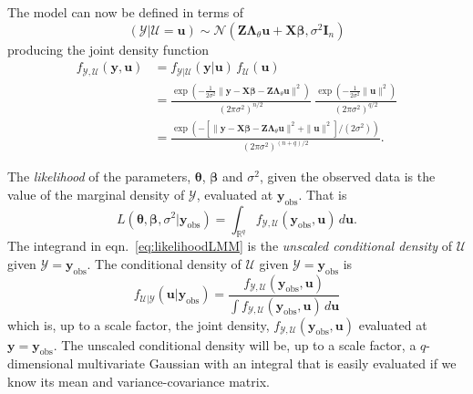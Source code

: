 \documentclass{jss}
\newcommand{\bLt}{\ensuremath{\bm\Lambda_\theta}}
\newcommand{\mc}[1]{\ensuremath{\mathcal{#1}}}
\newcommand{\yobs}{\ensuremath{\bm y_{\mathrm{obs}}}}
\newcommand*{\eq}[1]{eqn.~\ref{#1}}%
\begin{document}
The model can now be defined in terms of%
\begin{equation}
  \label{eq:LMMcondYU}
  (\mc Y|\mc U=\bm u)\sim\mc{N}(\bm Z\bm\Lambda_\theta\bm u+\bm X\bm\beta,\sigma^2\bm I_n)
\end{equation}%
producing the joint density function%
\begin{equation}
  \label{eq:jointDens}
  \begin{aligned}
    f_{\mc Y,\mc U}(\bm y,\bm u)&
    =f_{\mc Y|\mc U}(\bm y|\bm u)\,f_{\mc U}(\bm u)\\
    &=\frac{\exp(-\frac{1}{2\sigma^2}\|\bm y-\bm X\bm\beta-\bm Z\bLt\bm u\|^2)}
    {(2\pi\sigma^2)^{n/2}}\;
    \frac{\exp(-\frac{1}{2\sigma^2}\|\bm u\|^2)}{(2\pi\sigma^2)^{q/2}}\\
    &=\frac{\exp(-
      \left[\|\bm y-\bm X\bm\beta-\bm Z\bLt\bm u\|^2+\|\bm u\|^2\right]/(2\sigma^2))}
    {(2\pi\sigma^2)^{(n+q)/2}} .
  \end{aligned}
\end{equation}%

The \emph{likelihood} of the parameters, $\bm\theta$, $\bm\beta$ and
$\sigma^2$, given the observed data is the value of the
marginal density of $\mc Y$, evaluated at $\yobs$.  That is%
\begin{equation}
  \label{eq:likelihoodLMM}
  L(\bm\theta,\bm\beta,\sigma^2|\yobs)=\int_{\mathbb{R}^q}f_{\mc Y,\mc
    U}(\yobs,\bm u)\,d\bm u .
\end{equation}%
The integrand in \eq{eq:likelihoodLMM} is the \emph{unscaled
  conditional density} of $\mc U$ given $\mc Y=\yobs$.  The
conditional density of $\mc U$ given $\mc Y=\yobs$ is%
\begin{equation}
  \label{eq:condDens}
  f_{\mc U|\mc Y}(\bm u|\yobs)=\frac{f_{\mc Y,\mc U}(\yobs,\bm u)}
  {\int f_{\mc Y,\mc U}(\yobs,\bm u)\,d\bm u}
\end{equation}%
which is, up to a scale factor, the joint density, $f_{\mc Y,\mc
  U}(\yobs,\bm u)$ evaluated at $\bm y=\yobs$.  The unscaled conditional density will be, up to a
scale factor, a $q$-dimensional multivariate Gaussian with an integral
that is easily evaluated if we know its mean and variance-covariance
matrix.
\end{document}
